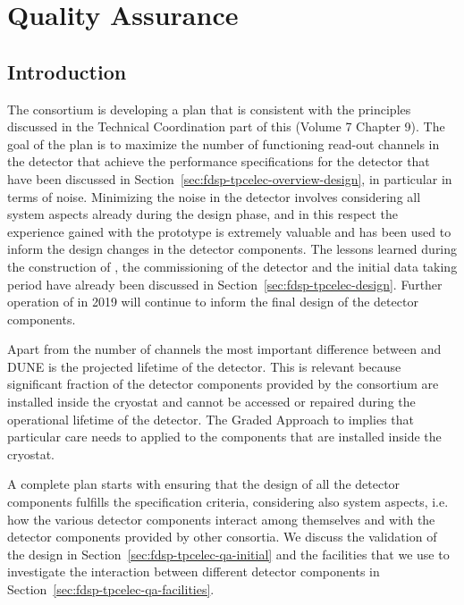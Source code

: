 \section{Quality Assurance}
\label{sec:fdsp-tpcelec-qa}

\subsection{Introduction}
\label{sec:fdsp-tpcelec-qa-introduction}

The  consortium is developing a  plan that is consistent
with the principles discussed in the Technical Coordination part of this 
 (Volume 7 Chapter 9). %
The goal of the  plan is to maximize the number of functioning
read-out channels in the detector that achieve the performance specifications
for the detector that have been discussed in Section~\ref{sec:fdsp-tpcelec-overview-design},
in particular in terms of noise. Minimizing the noise in the detector involves
considering all system aspects already during the design phase, and in this
respect the experience gained with the  prototype is extremely
valuable and has been used to inform the design changes in the detector 
components. The lessons learned during the construction of ,
the commissioning of the detector and the initial data taking period have
already been discussed in Section~\ref{sec:fdsp-tpcelec-design}. Further
operation of  in 2019 will continue to inform the final design
of the detector components.

Apart from the number of channels the most important difference
between  and DUNE is the projected lifetime of the detector. This
is relevant because significant fraction of the detector components provided 
by the  consortium are installed inside the cryostat and cannot 
be accessed or repaired during the operational lifetime of the detector. The 
Graded Approach to  implies that particular care needs to applied
to the  components that are installed inside the cryostat.

A complete  plan starts with ensuring that the design of all
the detector components fulfills the specification criteria, considering
also system aspects, i.e. how the various detector components interact
among themselves and with the detector components provided by other 
consortia. We discuss the validation of the design in 
Section~\ref{sec:fdsp-tpcelec-qa-initial} and the facilities that we use
to investigate the interaction between different detector components
in Section~\ref{sec:fdsp-tpcelec-qa-facilities}. 

